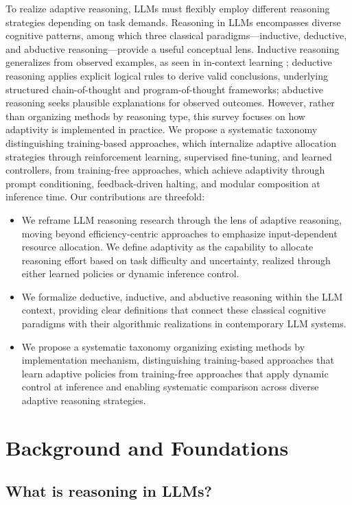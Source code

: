 \documentclass[11pt]{article}
\begin{document}
To realize adaptive reasoning, LLMs must flexibly employ different reasoning strategies depending on task demands. Reasoning in LLMs encompasses diverse cognitive patterns, among which three classical paradigms—inductive, deductive, and abductive reasoning—provide a useful conceptual lens. Inductive reasoning generalizes from observed examples, as seen in in-context learning \cite{brown2020language}; deductive reasoning applies explicit logical rules to derive valid conclusions, underlying structured chain-of-thought \cite{wei2022chain} and program-of-thought \cite{chen2022program} frameworks; abductive reasoning seeks plausible explanations for observed outcomes. However, rather than organizing methods by reasoning type, this survey focuses on how adaptivity is implemented in practice. We propose a systematic taxonomy distinguishing training-based approaches, which internalize adaptive allocation strategies through reinforcement learning, supervised fine-tuning, and learned controllers, from training-free approaches, which achieve adaptivity through prompt conditioning, feedback-driven halting, and modular composition at inference time.
Our contributions are threefold:
\begin{itemize}
\item We reframe LLM reasoning research through the lens of {adaptive reasoning}, moving beyond efficiency-centric approaches to emphasize input-dependent resource allocation. We define adaptivity as the capability to allocate reasoning effort based on task difficulty and uncertainty, realized through either learned policies or dynamic inference control.
\item We formalize deductive, inductive, and abductive reasoning within the LLM context, providing clear definitions that connect these classical cognitive paradigms with their algorithmic realizations in contemporary LLM systems.
\item We propose a systematic taxonomy organizing existing methods by implementation mechanism, distinguishing training-based approaches that learn adaptive policies from training-free approaches that apply dynamic control at inference and enabling systematic comparison across diverse adaptive reasoning strategies.
\end{itemize}
\section{Background and Foundations}
\subsection{What is reasoning in LLMs?}
\end{document}
